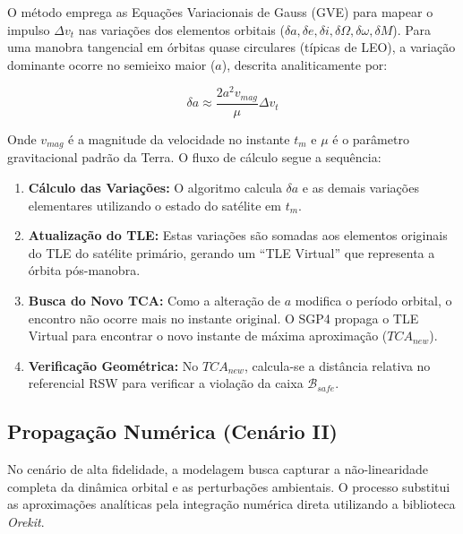 O método emprega as Equações Variacionais de Gauss (GVE) para mapear o impulso $\Delta v_t$ nas variações dos elementos orbitais ($\delta a, \delta e, \delta i, \delta \Omega, \delta \omega, \delta M$). Para uma manobra tangencial em órbitas quase circulares (típicas de LEO), a variação dominante ocorre no semieixo maior ($a$), descrita analiticamente por:

\begin{equation}
    \delta a \approx \frac{2 a^2 v_{mag}}{\mu} \Delta v_t
    \label{eq:gauss_a}
\end{equation}

Onde $v_{mag}$ é a magnitude da velocidade no instante $t_m$ e $\mu$ é o parâmetro gravitacional padrão da Terra. O fluxo de cálculo segue a sequência:

\begin{enumerate}
    \item \textbf{Cálculo das Variações:} O algoritmo calcula $\delta a$ e as demais variações elementares utilizando o estado do satélite em $t_m$.
    \item \textbf{Atualização do TLE:} Estas variações são somadas aos elementos originais do TLE do satélite primário, gerando um ``TLE Virtual'' que representa a órbita pós-manobra.
    \item \textbf{Busca do Novo TCA:} Como a alteração de $a$ modifica o período orbital, o encontro não ocorre mais no instante original. O SGP4 propaga o TLE Virtual para encontrar o novo instante de máxima aproximação ($TCA_{new}$).
    \item \textbf{Verificação Geométrica:} No $TCA_{new}$, calcula-se a distância relativa no referencial RSW para verificar a violação da caixa $\mathcal{B}_{safe}$.
\end{enumerate}



\subsection{Propagação Numérica (Cenário II)}
\label{subsec:numerical_modeling}

No cenário de alta fidelidade, a modelagem busca capturar a não-linearidade completa da dinâmica orbital e as perturbações ambientais. O processo substitui as aproximações analíticas pela integração numérica direta utilizando a biblioteca \textit{Orekit}.

